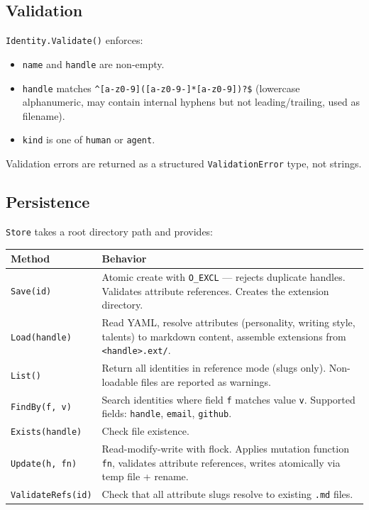 \documentclass[a4paper,10pt]{article}
\newcommand{\field}[1]{\texttt{#1}}
\newcommand{\fpath}[1]{\texttt{#1}}
\begin{document}
\subsection{Validation}

\texttt{Identity.Validate()} enforces:

\begin{itemize}
  \item \field{name} and \field{handle} are non-empty.
  \item \field{handle} matches
    \verb|^[a-z0-9]([a-z0-9-]*[a-z0-9])?$| (lowercase alphanumeric,
    may contain internal hyphens but not leading/trailing, used as
    filename).
  \item \field{kind} is one of \texttt{human} or \texttt{agent}.
\end{itemize}

Validation errors are returned as a structured
\texttt{ValidationError} type, not strings.

\subsection{Persistence}

\texttt{Store} takes a root directory path and provides:

\begin{center}
\begin{tabular}{@{}lp{7cm}@{}}
\toprule
\textbf{Method} & \textbf{Behavior} \\
\midrule
\texttt{Save(id)}        & Atomic create with \texttt{O\_EXCL} ---
                           rejects duplicate handles.  Validates
                           attribute references.  Creates the
                           extension directory. \\
\texttt{Load(handle)}    & Read YAML, resolve attributes (personality,
                           writing style, talents) to markdown content,
                           assemble extensions from
                           \fpath{<handle>.ext/}. \\
\texttt{List()}          & Return all identities in reference mode
                           (slugs only).  Non-loadable files are
                           reported as warnings. \\
\texttt{FindBy(f, v)}    & Search identities where field \texttt{f}
                           matches value \texttt{v}.  Supported fields:
                           \texttt{handle}, \texttt{email},
                           \texttt{github}. \\
\texttt{Exists(handle)}  & Check file existence. \\
\texttt{Update(h, fn)}   & Read-modify-write with flock.  Applies
                           mutation function \texttt{fn}, validates
                           attribute references, writes atomically
                           via temp file + rename. \\
\texttt{ValidateRefs(id)} & Check that all attribute slugs resolve to
                           existing \texttt{.md} files. \\
\bottomrule
\end{tabular}
\end{center}
\end{document}
